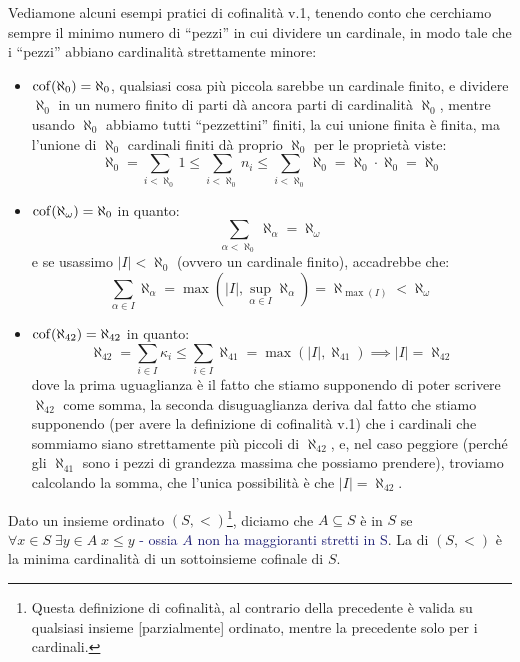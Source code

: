 \begin{example}
	Vediamone alcuni esempi pratici di cofinalità v.1, tenendo conto che cerchiamo sempre il minimo numero di ``pezzi'' in cui dividere un cardinale, in modo tale che i ``pezzi'' abbiano cardinalità strettamente minore:
	\begin{itemize}
		\item $\operatorname{cof}(\aleph_0) = \aleph_0$, qualsiasi cosa più piccola sarebbe un cardinale finito, e dividere $\aleph_0$ in un numero finito di parti dà ancora parti di cardinalità $\aleph_0$, mentre usando $\aleph_0$ abbiamo tutti ``pezzettini'' finiti, la cui unione finita è finita, ma l'unione di $\aleph_0$ cardinali finiti dà proprio $\aleph_0$ per le proprietà viste:
		\[ \aleph_0 = \sum_{i < \aleph_0} 1 \leq \sum_{i < \aleph_0} n_i \leq \sum_{i < \aleph_0} \aleph_0 = \aleph_0 \cdot \aleph_0 = \aleph_0
			\]
		\item $\operatorname{cof}(\aleph_\omega) = \aleph_0$ in quanto:
		\[ \sum_{\alpha < \aleph_0} \aleph_\alpha = \aleph_\omega
			\]
		e se usassimo $|I|<\aleph_0$ (ovvero un cardinale finito), accadrebbe che:
		\[\sum_{\alpha \in I} \aleph_\alpha = \max\left(|I|,\sup_{\alpha \in I} \aleph_\alpha\right) = \aleph_{\max(I)} < \aleph_\omega
		\]
		\item $\operatorname{cof}(\aleph_{42}) = \aleph_{42}$ in quanto:
		\[ \aleph_{42} = \sum_{i \in I} \kappa_i \leq \sum_{i \in I} \aleph_{41} = \max\left(|I|,\aleph_{41}\right) \implies |I| = \aleph_{42}
			\]
		dove la prima uguaglianza è il fatto che stiamo supponendo di poter scrivere $\aleph_{42}$ come somma, la seconda disuguaglianza deriva dal fatto che stiamo supponendo (per avere la definizione di cofinalità v.1) che i cardinali che sommiamo siano strettamente più piccoli di $\aleph_{42}$, e, nel caso peggiore (perché gli $\aleph_{41}$ sono i pezzi di
		grandezza massima che possiamo prendere), troviamo calcolando la somma, che 
		l'unica possibilità è che $|I| = \aleph_{42}$.
	\end{itemize}
\end{example}

\begin{definition}[Cofinalità - v.2]
	Dato un insieme ordinato $(S,<)$\footnote{Questa definizione di cofinalità, al contrario della precedente è valida su qualsiasi insieme [parzialmente] ordinato, mentre la
	precedente solo per i cardinali.}, diciamo che $A\subseteq S$ è  in $S$ se $\forall x \in S \; \exists y \in A \; x \leq y$ \textcolor{MidnightBlue}{- ossia $A$ non 
	ha maggioranti stretti in S}. La  di $(S,<)$ è la minima cardinalità di un sottoinsieme cofinale di $S$.
\end{definition}

